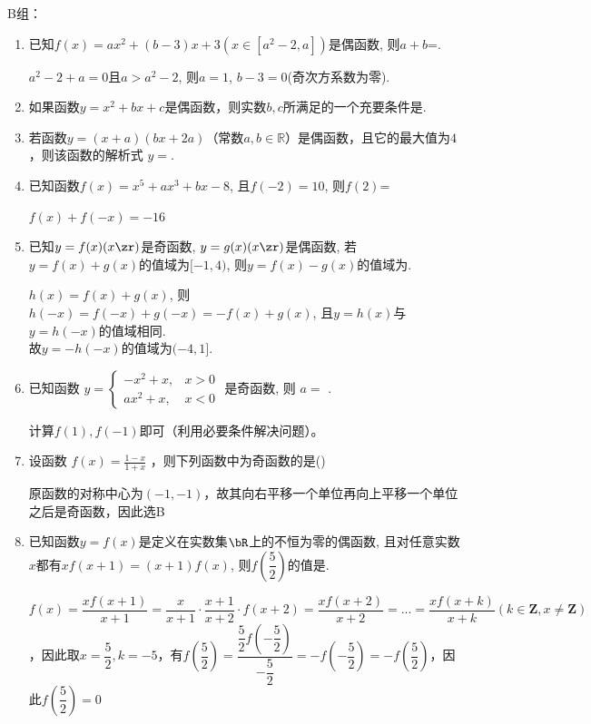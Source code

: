 B组：
\begin{enumerate}

\item 已知$f(x)=ax^2+(b-3)x+3(x\in[a^2-2,a])$是偶函数, 则$a+b$=.
\begin{jieda}
$a^2-2+a=0\mbox{且} a > a^2 - 2$, 则$a=1$, $b-3=0$(奇次方系数为零). 
\end{jieda}

\item 如果函数$y=x^2+bx+c$是偶函数，则实数$b,c$所满足的一个充要条件是.

\item 若函数$y=(x+a)(bx+2a)$（常数$a,b\in \mathbb{R}$）是偶函数，且它的最大值为$4$，则该函数的解析式 $y=$.


\item 已知函数$f(x)=x^5+ax^3+bx-8$, 且$f(-2)=10$, 则$f(2)$=
\begin{jieda}
$f(x)+f(-x)=-16$
\end{jieda}


\item 已知$y=f(x)(x\zr)$是奇函数, $y=g(x)(x\zr)$是偶函数, 若$y=f(x)+g(x)$的值域为$[-1,4)$, 则$y=f(x)-g(x)$的值域为\blkda{$(-4,1]$}. 
\begin{jieda}
$h(x)=f(x)+g(x)$, 则$h(-x)=f(-x)+g(-x)=-f(x)+g(x)$, 且$y=h(x)$与$y=h(-x)$的值域相同. \\
故$y=-h(-x)$的值域为$(-4,1]$. 
\end{jieda}

\item 已知函数 $y=\left\{\begin{array}{ll}-x^2+x, & x>0 \\ a x^2+x, & x<0\end{array}\right.$ 是奇函数, 则 $a=$ .
\begin{jieda}
    计算$f(1), f(-1)$即可（利用必要条件解决问题）。
\end{jieda}


\item 设函数 $f(x)=\frac{1-x}{1+x}$ ，则下列函数中为奇函数的是\dotfill()
\begin{jieda}
    原函数的对称中心为$(-1, -1)$，故其向右平移一个单位再向上平移一个单位之后是奇函数，因此选B
\end{jieda}


\item 已知函数$y=f(x)$是定义在实数集$\bR$上的不恒为零的偶函数, 且对任意实数$x$都有$xf(x+1)=(x+1)f(x)$, 则$f\left(\dfrac{5}{2}\right)$的值是.
\begin{jieda}
$f(x) = \dfrac{xf(x+1)}{x+1} = \dfrac{x}{x+1} \cdot \dfrac{x+1}{x+2} \cdot f(x+2) = \dfrac{xf(x+2)}{x+2} = ... = \dfrac{xf(x+k)}{x+k} (k \in \mathbf{Z}, x \neq \mathbf{Z})$，因此取$x = \dfrac{5}{2}, k = -5$，有$f(\dfrac{5}{2}) = \dfrac{\dfrac{5}{2}f(-\dfrac{5}{2})}{-\dfrac{5}{2}} = -f(-\dfrac{5}{2}) = -f(\dfrac{5}{2})$，因此$f(\dfrac{5}{2}) = 0$
\end{jieda}


\end{enumerate}
